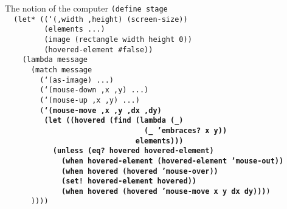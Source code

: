 \begin{frame}{The notion of the computer}
  \scriptsize
  \texttt{(define stage\\
    \ \ (let* ((`(,width ,height) (screen-size))\\
    \ \ \ \ \ \ \ \ \ (elements ...)\\
    \ \ \ \ \ \ \ \ \ (image (rectangle width height 0))\\
    \ \ \ \ \ \ \ \ \ (hovered-element \#false))\\
    \ \ \ \ (lambda message\\
    \ \ \ \ \ \ (match message\\
    \ \ \ \ \ \ \ \ (`(as-image) ...)\\
    \ \ \ \ \ \ \ \ (`(mouse-down ,x ,y) ...)\\
    \ \ \ \ \ \ \ \ (`(mouse-up ,x ,y) ...)\\
    \ \ \ \ \ \ \ \ (\textbf{`(mouse-move ,x ,y ,dx ,dy)\\
      \ \ \ \ \ \ \ \ \ (let ((hovered (find (lambda (\_)\\
      \ \ \ \ \ \ \ \ \ \ \ \ \ \ \ \ \ \ \ \ \ \ \ \ \ \ \ \ \ \ \ \ (\_ 'embraces? x y)) \\
      \ \ \ \ \ \ \ \ \ \ \ \ \ \ \ \ \ \ \ \ \ \ \ \ \ \ \ \ \ \ elements)))\\
    \ \ \ \ \ \ \ \ \ \ \ (unless (eq? hovered hovered-element)\\
    \ \ \ \ \ \ \ \ \ \ \ \ \ (when hovered-element (hovered-element 'mouse-out))\\
    \ \ \ \ \ \ \ \ \ \ \ \ \ (when hovered (hovered 'mouse-over))\\
    \ \ \ \ \ \ \ \ \ \ \ \ \ (set! hovered-element hovered))\\
    \ \ \ \ \ \ \ \ \ \ \ \ \ (when hovered (hovered 'mouse-move x y dx dy)))})\\
    \ \ \ \ \ \ ))))\\
    \ \\
    \ \\
    \ \\
    \ \\
    \ \\
    \ \\
    \ \\
    \ \\
    \ 
}
\end{frame}
